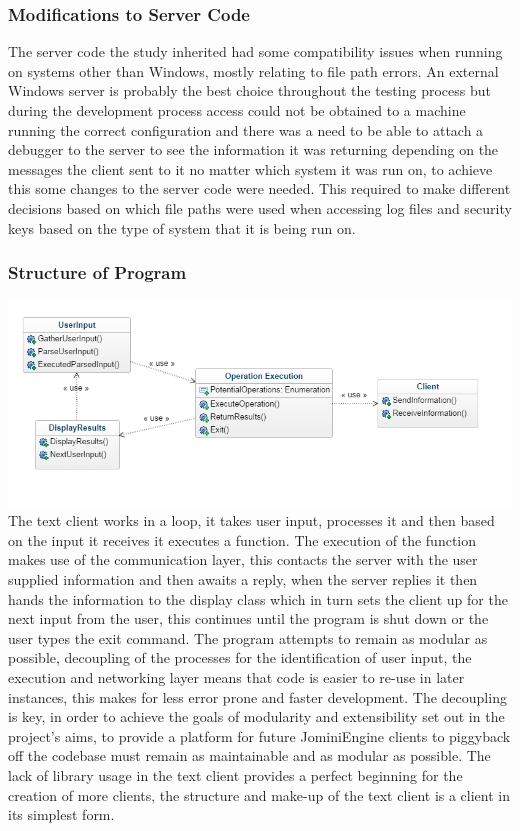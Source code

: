 \documentclass{article}
\begin{document}
\subsubsection{Modifications to Server Code}
The server code the study inherited had some compatibility issues when running on systems other than Windows, mostly relating to file path errors. An external Windows server is probably the best choice throughout the testing process but during the development process access could not be obtained to a machine running the correct configuration and there was a need to be able to attach a debugger to the server to see the information it was returning depending on the messages the client sent to it no matter which system it was run on, to achieve this some changes to the server code were needed. This required to make different decisions based on which file paths were used when accessing log files and security keys based on the type of system that it is being run on.
\subsubsection{Structure of Program}
\includegraphics[width=\textwidth]{textclient.png}\\
 The text client works in a loop, it takes user input, processes it and then based on the input it receives it executes a function. The execution of the function makes use of the communication layer, this contacts the server with the user supplied information and then awaits a reply, when the server replies it then hands the information to the display class which in turn sets the client up for the next input from the user, this continues until the program is shut down or the user types the exit command. The program attempts to remain as modular as possible, decoupling of the processes for the identification of user input, the execution and networking layer means that code is easier to re-use in later instances, this makes for less error prone and faster development. The decoupling is key, in order to achieve the goals of modularity and extensibility set out in the project's aims, to provide a platform for future JominiEngine clients to piggyback off the codebase must remain as maintainable and as modular as possible. The lack of library usage in the text client provides a perfect beginning for the creation of more clients, the structure and make-up of the text client is a client in its simplest form.
\end{document}
